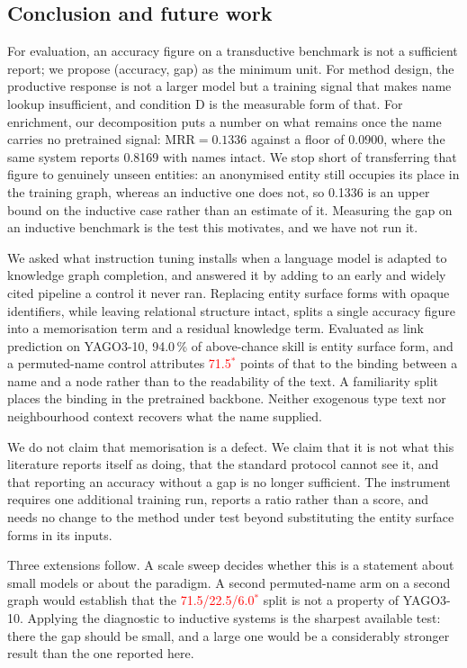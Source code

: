 \documentclass[conference]{IEEEtran}
\newcommand{\pv}[1]{\textcolor{red}{#1\ensuremath{^{\ast}}}}
\begin{document}
\subsection{Conclusion and future work}

For evaluation, an accuracy figure on a transductive
benchmark is not a sufficient report; we propose (accuracy, gap) as the minimum
unit. For method design, the productive response is not a larger model but a
training signal that makes name lookup insufficient, and condition D is the
measurable form of that. For enrichment, our decomposition puts a number on what
remains once the name carries no pretrained signal: $\mathrm{MRR}=0.1336$ against
a floor of 0.0900, where the same system reports 0.8169 with names intact. We
stop short of transferring that figure to genuinely unseen entities: an
anonymised entity still occupies its place in the training graph, whereas an
inductive one does not, so 0.1336 is an upper bound on the inductive case rather
than an estimate of it. Measuring the gap on an inductive benchmark is the test
this motivates, and we have not run it.

We asked what instruction tuning installs when a language model is adapted to
knowledge graph completion, and answered it by adding to an early and widely
cited pipeline a control it never ran. Replacing entity surface forms with opaque
identifiers, while leaving relational structure intact, splits a single accuracy
figure into a memorisation term and a residual knowledge term. Evaluated as link
prediction on YAGO3-10, 94.0\,\% of above-chance skill is entity surface form,
and a permuted-name control attributes \pv{71.5} points of that to the binding
between a name and a node rather than to the readability of the text. A
familiarity split places the binding in the pretrained backbone. Neither
exogenous type text nor neighbourhood context recovers what the name supplied.

We do not claim that memorisation is a defect. We claim that it is not what this
literature reports itself as doing, that the standard protocol cannot see it,
and that reporting an accuracy without a gap is no longer sufficient. The
instrument requires one additional training run, reports a ratio rather than a
score, and needs no change to the method under test beyond substituting the
entity surface forms in its inputs.

Three extensions follow. A scale sweep decides whether this is a statement about
small models or about the paradigm. A second permuted-name arm on a second graph
would establish that the \pv{71.5/22.5/6.0} split is not a property of YAGO3-10.
Applying the diagnostic to inductive systems is the sharpest available test:
there the gap should be small, and a large one would be a considerably stronger
result than the one reported here.
\end{document}
